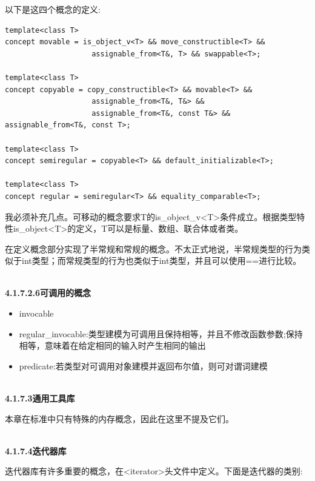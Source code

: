 以下是这四个概念的定义:

\begin{lstlisting}[style=styleCXX]
template<class T>
concept movable = is_object_v<T> && move_constructible<T> &&
					assignable_from<T&, T> && swappable<T>;

template<class T>
concept copyable = copy_constructible<T> && movable<T> &&
					assignable_from<T&, T&> &&
					assignable_from<T&, const T&> && assignable_from<T&, const T>;

template<class T>
concept semiregular = copyable<T> && default_initializable<T>;

template<class T>
concept regular = semiregular<T> && equality_comparable<T>;
\end{lstlisting}

我必须补充几点。可移动的概念要求T的is\_object\_v<T>条件成立。根据类型特性is\_object<T>的定义，T可以是标量、数组、联合体或者类。

在定义概念部分实现了半常规和常规的概念。不太正式地说，半常规类型的行为类似于int类型；而常规类型的行为也类似于int类型，并且可以使用==进行比较。

\hspace*{\fill} \\ %
\noindent
\textbf{4.1.7.2.6\hspace{0.2cm}可调用的概念}

\begin{itemize}
\item 
invocable

\item 
regular\_invocable:类型建模为可调用且保持相等，并且不修改函数参数;保持相等，意味着在给定相同的输入时产生相同的输出

\item 
predicate:若类型对可调用对象建模并返回布尔值，则可对谓词建模
\end{itemize}

\hspace*{\fill} \\ %
\noindent
\textbf{4.1.7.3\hspace{0.2cm}通用工具库}

本章在标准中只有特殊的内存概念，因此在这里不提及它们。

\hspace*{\fill} \\ %
\noindent
\textbf{4.1.7.4\hspace{0.2cm}迭代器库}

迭代器库有许多重要的概念，在<iterator>头文件中定义。下面是迭代器的类别:

